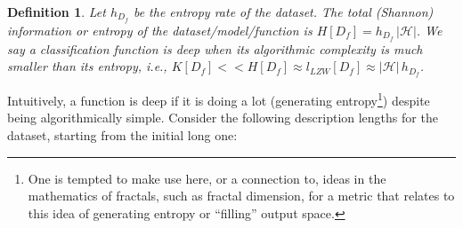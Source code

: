 \documentclass[11pt]{amsart}
\newcommand{\inputspace}{\mathcal X}
\newcommand{\handspace}{\mathcal H}
\newtheorem{definition}{Definition} %
\begin{document}
 
\begin{definition}
Let $h_{D_{f}}$ be the entropy rate of the dataset. The total (Shannon) information or entropy of the dataset/model/function is $H[D_{f}]=h_{D_{f}}\, | \handspace|$.
We say  a classification function  is deep when its algorithmic complexity is much smaller than its entropy, i.e.,  $K[D_{f}] <<H[D_{f}] \approx  l_{LZW}[D_{f}] \approx |\handspace| \, h_{D_{f}}$.
\end{definition}
Intuitively, a function is deep if it is doing a lot (generating entropy\footnote{One is tempted to make use here, or a connection to, ideas in the mathematics of fractals, such as fractal dimension, for a metric that relates to this idea of generating entropy or ``filling'' output space.}) despite being algorithmically simple. Consider the following description lengths for the dataset, starting from the initial long one:
\end{document}
